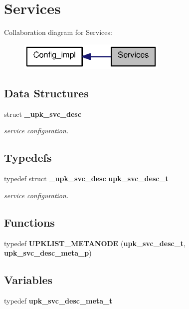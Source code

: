 \section{Services}
\label{group__services}
Collaboration diagram for Services:\nopagebreak
\begin{figure}[H]
\begin{center}
\leavevmode
\includegraphics[width=202pt]{group__services}
\end{center}
\end{figure}
\subsection*{Data Structures}
\begin{DoxyCompactItemize}
\item 
struct {\bf \_\-upk\_\-svc\_\-desc}
\begin{DoxyCompactList}\small\item\em service configuration. \end{DoxyCompactList}\end{DoxyCompactItemize}
\subsection*{Typedefs}
\begin{DoxyCompactItemize}
\item 
typedef struct {\bf \_\-upk\_\-svc\_\-desc} {\bf upk\_\-svc\_\-desc\_\-t}
\begin{DoxyCompactList}\small\item\em service configuration. \end{DoxyCompactList}\end{DoxyCompactItemize}
\subsection*{Functions}
\begin{DoxyCompactItemize}
\item 
typedef {\bf UPKLIST\_\-METANODE} ({\bf upk\_\-svc\_\-desc\_\-t}, {\bf upk\_\-svc\_\-desc\_\-meta\_\-p})
\end{DoxyCompactItemize}
\subsection*{Variables}
\begin{DoxyCompactItemize}
\item 
typedef {\bf upk\_\-svc\_\-desc\_\-meta\_\-t}
\end{DoxyCompactItemize}


